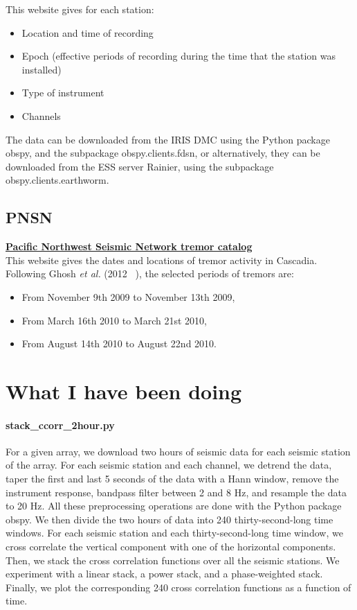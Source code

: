 \documentclass[workdone.tex]{subfiles}
\begin{document}
This website gives for each station:
\begin{itemize}
	\item Location and time of recording
	\item Epoch (effective periods of recording during the time that the station was installed)
	\item Type of instrument
	\item Channels
\end{itemize}

The data can be downloaded from the IRIS DMC using the Python package obspy, and the subpackage obspy.clients.fdsn, or alternatively, they can be downloaded from the ESS server Rainier, using the subpackage obspy.clients.earthworm.

\subsection{PNSN}

\href{https://www.pnsn.org/tremor}{\textbf{Pacific Northwest Seismic Network tremor catalog}} \\

This website gives the dates and locations of tremor activity in Cascadia. Following Ghosh \textit{et al.} (2012 ~\cite{GHO_2012}), the selected periods of tremors are:
\begin{itemize}
	\item From November 9th 2009 to November 13th 2009,
	\item From March 16th 2010 to March 21st 2010,
	\item From August 14th 2010 to August 22nd 2010.
\end{itemize}

\section{What I have been doing}

\paragraph{stack\_ccorr\_2hour.py} For a given array, we download two hours of seismic data for each seismic station of the array. For each seismic station and each channel, we detrend the data, taper the first and last 5 seconds of the data with a Hann window, remove the instrument response, bandpass filter between 2 and 8 Hz, and resample the data to 20 Hz. All these preprocessing operations are done with the Python package obspy. We then divide the two hours of data into 240 thirty-second-long time windows. For each seismic station and each thirty-second-long time window, we cross correlate the vertical component with one of the horizontal components. Then, we stack the cross correlation functions over all the seismic stations. We experiment with a linear stack, a power stack, and a phase-weighted stack. Finally, we plot the corresponding 240 cross correlation functions as a function of time. 
\end{document}

